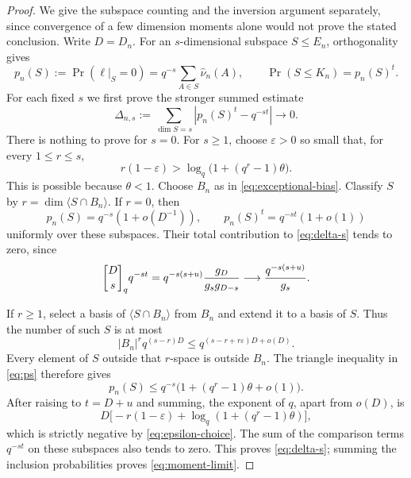 \begin{proof}
We give the subspace counting and the inversion argument separately, since
convergence of a few dimension moments alone would not prove the stated conclusion.
Write $D=D_n$. For an $s$-dimensional subspace $S\le E_n$, orthogonality gives
\begin{equation}\label{eq:ps}
 p_n(S):=\Pr(\ell|_S=0)
 =q^{-s}\sum_{A\in S}\widehat\nu_n(A),\qquad
 \Pr(S\le K_n)=p_n(S)^t.
\end{equation}
For each fixed $s$ we first prove the stronger summed estimate
\begin{equation}\label{eq:delta-s}
 \Delta_{n,s}:=\sum_{\dim S=s}\left|p_n(S)^t-q^{-st}\right|\longrightarrow0.
\end{equation}
There is nothing to prove for $s=0$. For $s\ge1$, choose $\varepsilon>0$
so small that, for every $1\le r\le s$,
\begin{equation}\label{eq:epsilon-choice}
 r(1-\varepsilon)>\log_q\bigl(1+(q^r-1)\theta\bigr).
\end{equation}
This is possible because $\theta<1$. Choose $B_n$ as in
\eqref{eq:exceptional-bias}. Classify $S$ by
$r=\dim\langle S\cap B_n\rangle$. If $r=0$, then
\[
 p_n(S)=q^{-s}(1+o(D^{-1})),\qquad
 p_n(S)^t=q^{-st}(1+o(1))
\]
uniformly over these subspaces. Their total contribution to
\eqref{eq:delta-s} tends to zero, since
\begin{equation}\label{eq:baseline-moment}
 \qbinom{D}{s}q^{-st}
 =q^{-s(s+u)}\frac{g_D}{g_sg_{D-s}}
 \longrightarrow\frac{q^{-s(s+u)}}{g_s}.
\end{equation}

If $r\ge1$, select a basis of $\langle S\cap B_n\rangle$ from $B_n$ and
extend it to a basis of $S$. Thus the number of such $S$ is at most
\[
 |B_n|^r q^{(s-r)D}\le q^{(s-r+r\varepsilon)D+o(D)}.
\]
Every element of $S$ outside that $r$-space is outside $B_n$. The triangle
inequality in \eqref{eq:ps} therefore gives
\[
 p_n(S)\le q^{-s}\bigl(1+(q^r-1)\theta+o(1)\bigr).
\]
After raising to $t=D+u$ and summing, the exponent of $q$, apart from $o(D)$,
is
\[
 D\bigl[-r(1-\varepsilon)+
       \log_q(1+(q^r-1)\theta)\bigr],
\]
which is strictly negative by \eqref{eq:epsilon-choice}. The sum of the
comparison terms $q^{-st}$ on these subspaces also tends to zero. This
proves \eqref{eq:delta-s}; summing the inclusion probabilities proves
\eqref{eq:moment-limit}.


\end{proof}
